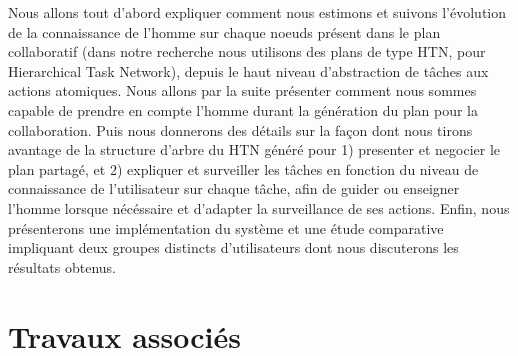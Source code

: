 \documentclass[a4paper,11pt,twoside]{StyleThese}
\begin{document}
Nous allons tout d'abord expliquer comment nous estimons et suivons l'évolution de la connaissance de l'homme sur chaque noeuds présent dans le plan collaboratif (dans notre recherche nous utilisons des plans de type HTN, pour Hierarchical Task Network), depuis le haut niveau d'abstraction de tâches aux actions atomiques. Nous allons par la suite présenter comment nous sommes capable de prendre en compte l'homme durant la génération du plan pour la collaboration. Puis nous donnerons des détails sur la façon dont nous tirons avantage de la structure d'arbre du HTN généré pour 1) presenter et negocier le plan partagé,
et 2) expliquer et surveiller les tâches en fonction du niveau de connaissance de l'utilisateur sur chaque tâche, afin de guider ou enseigner l'homme lorsque nécéssaire et d'adapter la surveillance de ses actions. Enfin, nous présenterons une implémentation du système et une étude comparative impliquant deux groupes distincts d'utilisateurs dont nous discuterons les résultats obtenus.




\section{Travaux associés}



\end{document}
